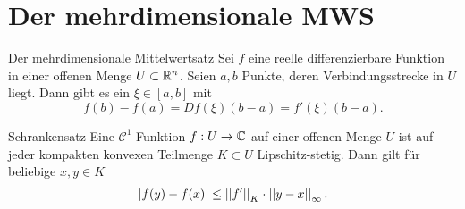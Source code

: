 \documentclass[main.tex]{subfiles}
\begin{document}
\section*{Der mehrdimensionale MWS}

\begin{karte}{Der mehrdimensionale Mittelwertsatz}
    Sei \( f \) eine reelle differenzierbare Funktion 
    in einer offenen Menge \( U \subset \mathbb{R}^n \). Seien 
    \( a, b \) Punkte, deren Verbindungsstrecke in \( U \)
    liegt. Dann gibt es ein \( \xi \in [a,b] \) mit 
    \[ f(b) - f(a) = Df(\xi) (b-a) = f'(\xi)(b-a). \] 
\end{karte}

\begin{karte}{Schrankensatz}
    Eine \( \mathcal{C}^1 \)-Funktion \( f : U \rightarrow \mathbb{C} \) 
    auf einer offenen Menge \( U \) ist auf jeder kompakten
    konvexen Teilmenge \( K \subset U \) Lipschitz-stetig.
    Dann gilt für beliebige \( x,y \in K \)
    \[ \left|  f(y) - f(x)  \right| \leq \left|\left|f'\right|\right|_K \cdot \left|\left|y - x\right|\right|_\infty. \]
\end{karte}
\end{document}
